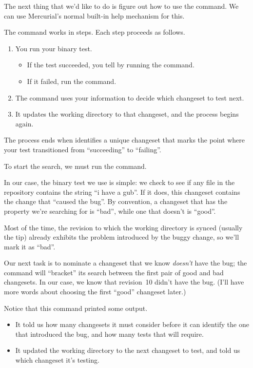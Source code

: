 The next thing that we'd like to do is figure out how to use the
 command.  We can use Mercurial's normal built-in help
mechanism for this.

The  command works in steps.  Each step proceeds as follows.
\begin{enumerate}
\item You run your binary test.
  \begin{itemize}
  \item If the test succeeded, you tell  by running the
     command.
  \item If it failed, run the  command.
  \end{itemize}
\item The command uses your information to decide which changeset to
  test next.
\item It updates the working directory to that changeset, and the
  process begins again.
\end{enumerate}
The process ends when  identifies a unique changeset
that marks the point where your test transitioned from ``succeeding''
to ``failing''.

To start the search, we must run the  command.

In our case, the binary test we use is simple: we check to see if any
file in the repository contains the string ``i have a gub''.  If it
does, this changeset contains the change that ``caused the bug''.  By
convention, a changeset that has the property we're searching for is
``bad'', while one that doesn't is ``good''.

Most of the time, the revision to which the working directory is
synced (usually the tip) already exhibits the problem introduced by
the buggy change, so we'll mark it as ``bad''.

Our next task is to nominate a changeset that we know \emph{doesn't}
have the bug; the  command will ``bracket'' its search
between the first pair of good and bad changesets.  In our case, we
know that revision~10 didn't have the bug.  (I'll have more words
about choosing the first ``good'' changeset later.)

Notice that this command printed some output.
\begin{itemize}
\item It told us how many changesets it must consider before it can
  identify the one that introduced the bug, and how many tests that
  will require.
\item It updated the working directory to the next changeset to test,
  and told us which changeset it's testing.
\end{itemize}

